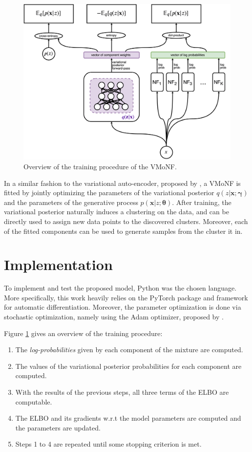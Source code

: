 \begin{figure}[!htb]
  \centering
  \includegraphics[width=0.85\linewidth]{figures/train_overview.png}
  \caption{Overview of the training procedure of the VMoNF.}
  \label{fig:modeloverview}
\end{figure}

In a similar fashion to the variational auto-encoder, proposed by \textcite{vaepaper},
a VMoNF is fitted by jointly optimizing the parameters of the variational
posterior $q(z|\bm{x}; \bm\gamma)$ and the parameters of the generative process
$p(\bm{x}|z; \bm\theta)$.
After training, the variational posterior naturally induces a clustering on
the data, and can be directly used to assign new data points to the discovered clusters.
Moreover, each of the fitted components can be used to generate samples from the
cluster it  in.

\section{Implementation}

To implement and test the proposed model, Python was the chosen language. More
specifically, this work heavily relies on the PyTorch \autocite{pytorch} package
and framework for automatic differentiation. Moreover, the parameter optimization
is done via stochastic optimization, namely using the Adam optimizer, proposed by
\textcite{adam}.

Figure \ref{fig:modeloverview} gives an overview of the training procedure:
\begin{enumerate}
    \item The \emph{log-probabilities} given by each component of the mixture
    are computed.
    \item The values of the variational posterior probabilities for each
    component are computed.
    \item With the results of the previous steps, all three terms of the ELBO
    are computable.
    \item The ELBO and its gradients w.r.t the model parameters are computed
    and the parameters are updated.
    \item Steps 1 to 4 are repeated until some stopping criterion is met.
\end{enumerate}

